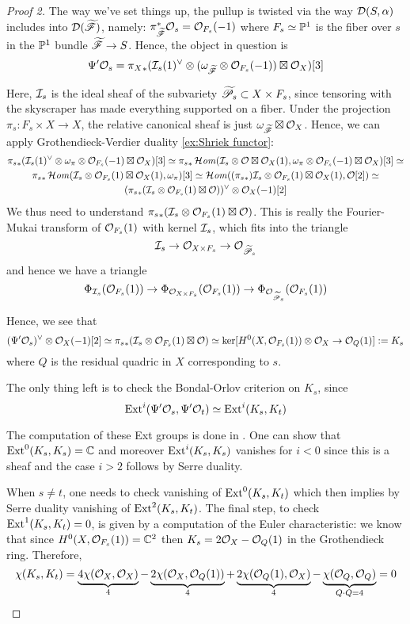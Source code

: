 \begin{proof}[Proof 2]
The way we've set things up, the pullup is twisted via the way $\calD(S,\alpha)$ includes into $\calD(\tscrF)$, namely: $\pi^*_{\tscrF}\O_s=\O_{F_s}(-1)$ where $F_s \simeq \P^1$ is the fiber over $s$ in the $\P^1$ bundle $\tscrF\rightarrow S$. Hence, the object in question is $$\Psi'\O_s={\pi_X}_*(\calI_s(1)^\vee \otimes (\omega_{\tscrF}\otimes \O_{F_s}(-1))\boxtimes \O_X)[3]$$

Here, $\calI_s$ is the ideal sheaf of the subvariety $\tscrP_s \subset X \times F_s$, since tensoring with the skyscraper has made everything supported on a fiber. Under the projection $\pi_s: F_s\times X \rightarrow X$, the relative canonical sheaf is just $\omega_{\tscrF}\boxtimes \O_X$. Hence, we can apply Grothendieck-Verdier duality \ref{ex:Shriek functor}:
    \begin{gather*}
        {\pi_s}_*(\calI_s(1)^\vee \otimes \omega_{\pi}\otimes \O_{F_s}(-1)\boxtimes \O_X)[3]\simeq 
        {\pi_s}_*\lHom(\calI_s\otimes \O\boxtimes \O_X(1), \omega_{\pi}\otimes \O_{F_s}(-1)\boxtimes \O_X)[3]\simeq \\
        {\pi_s}_*\lHom(\calI_s\otimes \O_{F_s}(1)\boxtimes \O_X(1), \omega_{\pi})[3]\simeq
        \lHom(({\pi_s}_*)\calI_s\otimes \O_{F_s}(1)\boxtimes \O_X(1), \O[2])\simeq\\
        ({\pi_s}_*(\calI_s\otimes \O_{F_s}(1)\boxtimes \O))^\vee\otimes \O_X(-1) [2]
    \end{gather*}
We thus need to understand ${\pi_s}_*(\calI_s\otimes \O_{F_s}(1)\boxtimes \O)$. This is really the Fourier-Mukai transform of $\O_{F_s}(1)$ with kernel $\calI_s$, which fits into the triangle $$\calI_s\rightarrow \O_{X\times F_s}\rightarrow \O_{\tscrP_s}$$and hence we have a triangle $$\Phi_{\calI_s}(\O_{F_s}(1))\rightarrow \Phi_{\O_{X\times F_s}}(\O_{F_s}(1))\rightarrow \Phi_{\O_{\tscrP_s}}(\O_{F_s}(1))$$

Hence, we see that $$(\Psi'\O_s)^\vee\otimes \O_X(-1)[2]\simeq {\pi_s}_*(\calI_s\otimes \O_{F_s}(1)\boxtimes \O)\simeq \ker[H^0(X,\O_{F_s}(1))\otimes \O_X \rightarrow \O_Q(1)]:=K_s$$
where $Q$ is the residual quadric in $X$ corresponding to $s$.

The only thing left is to check the Bondal-Orlov criterion on $K_s$, since $$\Ext^i(\Psi'\O_s, \Psi'\O_t)\simeq \Ext^i(K_s,K_t)$$

The computation of these Ext groups is done in \cite[\S7, Lemma~3.7]{huybrechts_geometry_2023}. One can show that $\Ext^0(K_s,K_s)=\C$ and moreover $\Ext^i(K_s,K_s)$ vanishes for $i<0$ since this is a sheaf and the case $i>2$ follows by Serre duality.

When $s\neq t$, one needs to check vanishing of $\Ext^0(K_s, K_t)$ which then implies by Serre duality vanishing of $\Ext^2(K_s, K_t)$. The final step, to check $\Ext^1(K_s, K_t)=0$, is given by a computation of the Euler characteristic: we know that since $H^0(X,\O_{F_s}(1))=\C^2$ then $K_s=2\O_X-\O_Q(1)$ in the Grothendieck ring. Therefore,
$$\chi(K_s,K_t)=\underbrace{4\chi(\O_X,\O_X)}_4-\underbrace{2\chi(\O_X,\O_Q(1))}_4+\underbrace{2\chi(\O_Q(1),\O_X)}_4-\underbrace{\chi(\O_Q,\O_Q)}_{Q\cdot Q=4}=0$$
\end{proof}

